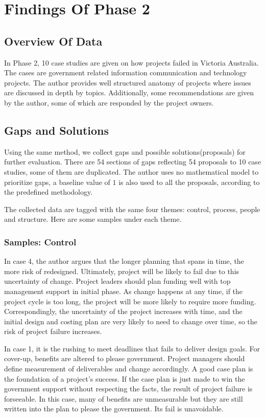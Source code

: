 
\section{Findings Of Phase 2}

\subsection{Overview Of Data}
In Phase 2, 10 case studies are given on how projects failed in Victoria Australia. The cases are government related information communication and technology projects. The author\parencite{case_study} provides well structured anatomy of projects where issues are discussed in depth by topics. Additionally, some recommendations are given by the author, some of which are responded by the project owners.

\subsection{Gaps and Solutions}
Using the same method, we collect gaps and possible solutions(proposals) for further evaluation. There are 54 sections of gaps reflecting 54 proposals to 10 case studies, some of them are duplicated. The author uses no mathematical model to prioritize gaps, a baseline value of $1$ is also used to all the proposals, according to the predefined methodology.

The collected data are tagged with the same four themes: control, process, people and structure. Here are some samples under each theme.

\subsubsection{Samples: Control}
In case 4, the author argues that the longer planning that spans in time, the more risk of redesigned. Ultimately, project will be likely to fail due to this uncertainty of change. Project leaders should plan funding well with top management support in initial phase. As change happens at any time, if the project cycle is too long, the project will be more likely to require more funding. Correspondingly, the uncertainty of the project increases with time, and the initial design and costing plan are very likely to need to change over time, so the risk of project failure increases.


In case 1, it is the rushing to meet deadlines that fails to deliver design goals. For cover-up, benefits are altered to please government. Project managers should define measurement of deliverables and change accordingly. A good case plan is the foundation of a project's success. If the case plan is just made to win the government support without respecting the facts, the result of project failure is forseeable. In this case, many of benefits are unmeasurable but they are still written into the plan to please the government. Its fail is unavoidable.

